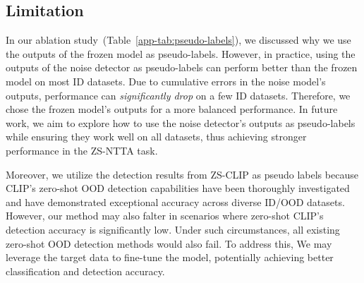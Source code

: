 \begin{table}[ht]
  \caption{Comparison between ZS-NTTA and test-time OOD detection setting~\citep{fan2024test, gao2023atta}.}
  \label{tab:setting-diff}
  \centering
\end{table}


\subsection{Limitation}\label{app:limitation}
In our ablation study~(Table~\ref{app-tab:pseudo-labels}), we discussed why we use the outputs of the frozen model as pseudo-labels. However, in practice, using the outputs of the noise detector as pseudo-labels can perform better than the frozen model on most ID datasets. Due to cumulative errors in the noise model’s outputs, performance can \textit{significantly drop} on a few ID datasets. Therefore, we chose the frozen model’s outputs for a more balanced performance. In future work, we aim to explore how to use the noise detector’s outputs as pseudo-labels while ensuring they work well on all datasets, thus achieving stronger performance in the ZS-NTTA task.

Moreover, we utilize the detection results from ZS-CLIP as pseudo labels because CLIP's zero-shot OOD detection capabilities have been thoroughly investigated~\citep{ming2022delving, wang2023clipn, jiang2024neglabel, esmaeilpour2022zero} and have demonstrated exceptional accuracy across diverse ID/OOD datasets. However, our method may also falter in scenarios where zero-shot CLIP's detection accuracy is significantly low. Under such circumstances, all existing zero-shot OOD detection methods would also fail. To address this, We may leverage the target data to fine-tune the model, potentially achieving better classification and detection accuracy.




